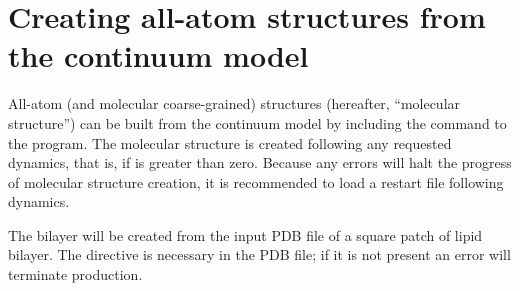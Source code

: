 
\section{ Creating all-atom structures from the continuum model } \label{sec:all_atom}

All-atom (and molecular coarse-grained) structures (hereafter, ``molecular structure'') can be built from the continuum model by including the  command to the  program. 
The molecular structure is created following any requested dynamics, that is, if  is greater than zero.
Because any errors will halt the progress of molecular structure creation, it is recommended to load a restart file following dynamics.

The bilayer will be created from the input  PDB file of a square patch of lipid bilayer.
The  directive is necessary in the PDB file; if it is not present an error will terminate production.

 
